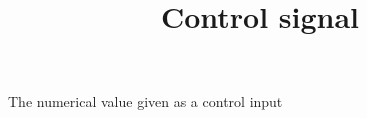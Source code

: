 \documentclass[a4paper]{article}
\title{Control signal}
\date{}
\begin{document}
\maketitle
    The numerical value given as a control input
\end{document}
